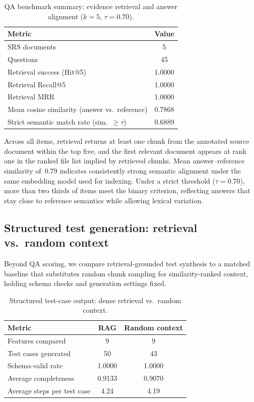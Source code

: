 \documentclass[conference]{IEEEtran}
\begin{document}
\begin{table}[h]
\centering
\caption{QA benchmark summary: evidence retrieval and answer alignment ($k{=}5$, $\tau{=}0.70$).}
\label{tab:overall_results}
\begin{tabular}{lc}
\hline
Metric & Value \\
\hline
SRS documents & 5 \\
Questions & 45 \\
Retrieval success (Hit@5) & 1.0000 \\
Retrieval Recall@5 & 1.0000 \\
Retrieval MRR & 1.0000 \\
Mean cosine similarity (answer vs.\ reference) & 0.7868 \\
Strict semantic match rate (sim.\ $\geq\tau$) & 0.6889 \\
\hline
\end{tabular}
\end{table}

Across all items, retrieval returns at least one chunk from the annotated source document within the top five, and the first relevant document appears at rank one in the ranked file list implied by retrieved chunks. Mean answer--reference similarity of~0.79 indicates consistently strong semantic alignment under the same embedding model used for indexing. Under a strict threshold ($\tau{=}0.70$), more than two thirds of items meet the binary criterion, reflecting answers that stay close to reference semantics while allowing lexical variation.

\subsection{Structured test generation: retrieval vs.\ random context}

Beyond QA scoring, we compare retrieval-grounded test synthesis to a matched baseline that substitutes random chunk sampling for similarity-ranked context, holding schema checks and generation settings fixed.

\begin{table}[h]
\centering
\caption{Structured test-case output: dense retrieval vs.\ random context.}
\label{tab:rag_vs_norag}
\begin{tabular}{lcc}
\hline
Metric & RAG & Random context \\
\hline
Features compared & 9 & 9 \\
Test cases generated & 50 & 43 \\
Schema-valid rate & 1.0000 & 1.0000 \\
Average completeness & 0.9133 & 0.9070 \\
Average steps per test case & 4.24 & 4.19 \\
\hline
\end{tabular}
\end{table}
\end{document}

